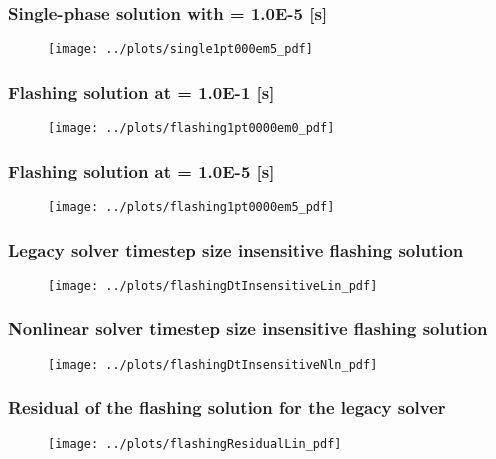 \documentclass[compress,xcolor=table]{beamer}
\begin{document}
\begin{frame}
\frametitle{Single-phase solution with \dtmax{} = 1.0E-5 {[s]}}

\begin{figure}[h!t]
\centering
\texttt{[image: ../plots/single1pt000em5\_pdf]}
\end{figure}

\end{frame}
\begin{frame}
\frametitle{Flashing solution at \dtmax{} = 1.0E-1 {[s]}}

\begin{figure}[h!t]
\centering
\texttt{[image: ../plots/flashing1pt0000em0\_pdf]}
\end{figure}

\end{frame}
\begin{frame}
\frametitle{Flashing solution at \dtmax{} = 1.0E-5 {[s]}}

\begin{figure}[h!t]
\centering
\texttt{[image: ../plots/flashing1pt0000em5\_pdf]}
\end{figure}

\end{frame}
\begin{frame}
\frametitle{Legacy solver timestep size insensitive flashing solution}

\begin{figure}[h!t]
\centering
\texttt{[image: ../plots/flashingDtInsensitiveLin\_pdf]}
\end{figure}

\end{frame}
\begin{frame}
\frametitle{Nonlinear solver timestep size insensitive flashing solution}

\begin{figure}[h!t]
\centering
\texttt{[image: ../plots/flashingDtInsensitiveNln\_pdf]}
\end{figure}

\end{frame}
\begin{frame}
\frametitle{Residual of the flashing solution for the legacy solver}

\begin{figure}[h!t]
\centering
\texttt{[image: ../plots/flashingResidualLin\_pdf]}
\end{figure}

\end{frame}
\end{document}
